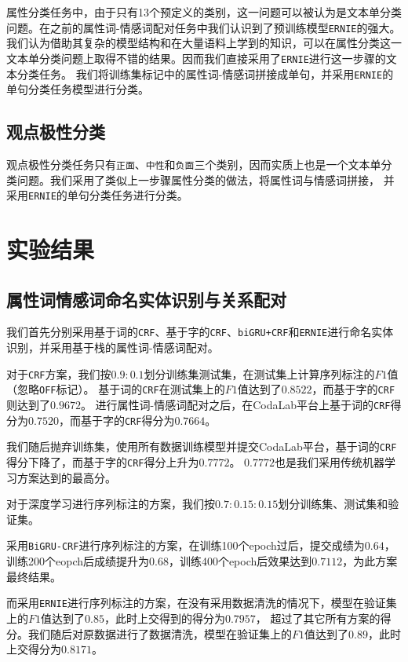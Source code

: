 \documentclass[11pt,a4paper]{article}
\begin{document}
属性分类任务中，由于只有13个预定义的类别，这一问题可以被认为是文本单分类问题。在之前的属性词-情感词配对任务中我们认识到了预训练模型\texttt{ERNIE}的强大。
我们认为借助其复杂的模型结构和在大量语料上学到的知识，可以在属性分类这一文本单分类问题上取得不错的结果。因而我们直接采用了\texttt{ERNIE}进行这一步骤的文本分类任务。
我们将训练集标记中的属性词-情感词拼接成单句，并采用\texttt{ERNIE}的单句分类任务模型进行分类。

\subsection{观点极性分类}

观点极性分类任务只有\texttt{正面}、\texttt{中性}和\texttt{负面}三个类别，因而实质上也是一个文本单分类问题。我们采用了类似上一步骤属性分类的做法，将属性词与情感词拼接，
并采用\texttt{ERNIE}的单句分类任务进行分类。

\section{实验结果}

\subsection{属性词情感词命名实体识别与关系配对}
我们首先分别采用基于词的\texttt{CRF}、基于字的\texttt{CRF}、\texttt{biGRU+CRF}和\texttt{ERNIE}进行命名实体识别，并采用基于栈的属性词-情感词配对。

对于\texttt{CRF}方案，我们按$0.9:0.1$划分训练集测试集，在测试集上计算序列标注的$F1$值（忽略\texttt{OFF}标记）。
基于词的\texttt{CRF}在测试集上的$F1$值达到了$0.8522$，而基于字的\texttt{CRF}则达到了$0.9672$。
进行属性词-情感词配对之后，在CodaLab平台上基于词的\texttt{CRF}得分为$0.7520$，而基于字的\texttt{CRF}得分为$0.7664$。

我们随后抛弃训练集，使用所有数据训练模型并提交CodaLab平台，基于词的\texttt{CRF}得分下降了，而基于字的\texttt{CRF}得分上升为$0.7772$。
$0.7772$也是我们采用传统机器学习方案达到的最高分。

对于深度学习进行序列标注的方案，我们按$0.7:0.15:0.15$划分训练集、测试集和验证集。

采用\texttt{BiGRU-CRF}进行序列标注的方案，在训练100个epoch过后，提交成绩为$0.64$，训练200个eopch后成绩提升为$0.68$，训练400个epoch后效果达到$0.7112$，为此方案最终结果。

而采用\texttt{ERNIE}进行序列标注的方案，在没有采用数据清洗的情况下，模型在验证集上的$F1$值达到了$0.85$，此时上交得到的得分为$0.7957$，
超过了其它所有方案的得分。我们随后对原数据进行了数据清洗，模型在验证集上的$F1$值达到了$0.89$，此时上交得分为$0.8171$。
\end{document}

